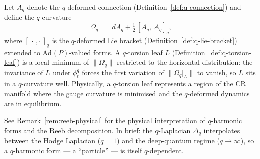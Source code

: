 \begin{remark}
\label{rem:q-torsion-leaf-minimum}
Let $A_q$ denote the $q$-deformed connection
(Definition~\ref{def:q-connection}) and define the $q$-curvature
\[
  \Omega_q \;=\; dA_q + \tfrac{1}{2}\,[A_q,\, A_q]_q,
\]
where $[\,\cdot\,,\cdot\,]_q$ is the $q$-deformed Lie bracket
(Definition~\ref{def:q-lie-bracket}) extended to $\mathrm{Ad}(P)$-valued
forms.  A $q$-torsion leaf $L$ (Definition~\ref{def:q-torsion-leaf}) is a
local minimum of $\lVert\Omega_q\rVert$ restricted to the horizontal
distribution: the invariance of $L$ under $\phi_t^q$ forces the first
variation of $\lVert\Omega_q|_L\rVert$ to vanish, so $L$ sits in a
$q$-curvature well.  Physically, a $q$-torsion leaf represents a region of
the CR manifold where the gauge curvature is minimised and the $q$-deformed
dynamics are in equilibrium.
\end{remark}

\begin{remark}
\label{rem:q-harmonic-physical}
See Remark~\ref{rem:reeb-physical} for the physical interpretation of
$q$-harmonic forms and the Reeb decomposition.  In brief: the
$q$-Laplacian $\Delta_q$ interpolates between the Hodge Laplacian
($q = 1$) and the deep-quantum regime ($q \to \infty$), so a
$q$-harmonic form --- a ``particle'' --- is itself $q$-dependent.
\end{remark}

